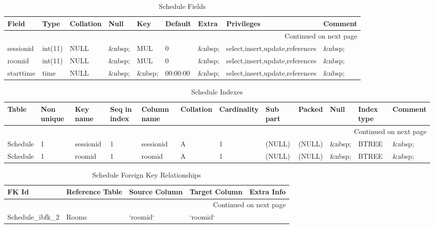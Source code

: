 \documentclass[tablesignature,landscape]{scrartcl}
\begin{document}
\begin{longtable}{|l|l|l|l|l|l|l|l|l|}
\caption{Schedule Fields} \label{tbl:schedulefields}\\
\hline
 Field       &  Type     &  Collation  &  Null     &  Key      &   Default  &  Extra              &  Privileges                       &  Comment \\
\hline
\endhead
\hline\multicolumn{9}{r}{Continued on next page}\
\endfoot
\endlastfoot
\hline
 scheduleid  &  int(11)  &  NULL       &  \&nbsp;  &  PRI      &    (NULL)  &  auto\_{}increment  &  select,insert,update,references  &  \&nbsp;  \\
 sessionid   &  int(11)  &  NULL       &  \&nbsp;  &  MUL      &         0  &  \&nbsp;            &  select,insert,update,references  &  \&nbsp;  \\
 roomid      &  int(11)  &  NULL       &  \&nbsp;  &  MUL      &         0  &  \&nbsp;            &  select,insert,update,references  &  \&nbsp;  \\
 starttime   &  time     &  NULL       &  \&nbsp;  &  \&nbsp;  &  00:00:00  &  \&nbsp;            &  select,insert,update,references  &  \&nbsp;  \\
\hline
\end{longtable}


\begin{longtable}{|l|l|l|l|l|l|l|l|l|l|l|l|}
\caption{Schedule Indexes} \label{tbl:scheduleindexes}\\
\hline
 Table     &  Non unique  &  Key name   &  Seq in index  &  Column name  &  Collation  &  Cardinality  &  Sub part  &  Packed  &  Null     &  Index type  &  Comment \\
\hline
\endhead
\hline\multicolumn{12}{r}{Continued on next page}\
\endfoot
\endlastfoot
\hline
 Schedule  &           0  &  PRIMARY    &             1  &  scheduleid   &  A          &            1  &  (NULL)    &  (NULL)  &  \&nbsp;  &  BTREE       &  \&nbsp;  \\
 Schedule  &           1  &  sessionid  &             1  &  sessionid    &  A          &            1  &  (NULL)    &  (NULL)  &  \&nbsp;  &  BTREE       &  \&nbsp;  \\
 Schedule  &           1  &  roomid     &             1  &  roomid       &  A          &            1  &  (NULL)    &  (NULL)  &  \&nbsp;  &  BTREE       &  \&nbsp;  \\
\hline
\end{longtable}


\begin{longtable}{|l|l|l|l|l|}
\caption{Schedule Foreign Key Relationships} \label{tbl:schedulefkr}\\
\hline
 FK Id                  &  Reference Table  &  Source Column  &  Target Column  &  Extra Info \\
\hline
\endhead
\hline\multicolumn{5}{r}{Continued on next page}\
\endfoot
\endlastfoot
\hline
 Schedule\_{}ibfk\_{}1  &  Sessions         &  `sessionid`    &  `sessionid`    &              \\
 Schedule\_{}ibfk\_{}2  &  Rooms            &  `roomid`       &  `roomid`       &              \\
\hline
\end{longtable}
\end{document}
